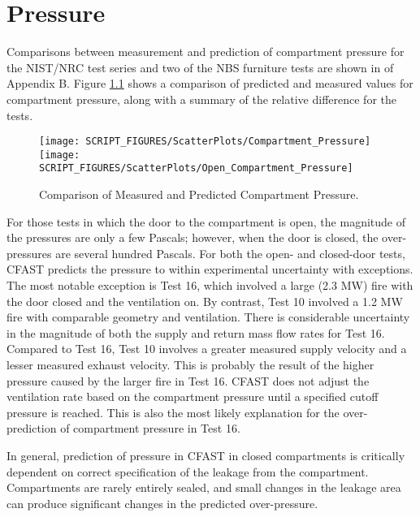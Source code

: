 \chapter{Pressure}

Comparisons between measurement and prediction of compartment pressure for the NIST/NRC test series and two of the NBS furniture tests are shown in of Appendix B.  Figure \ref{fig:Pressure_Scatter} shows a comparison of predicted and measured values for compartment pressure, along with a summary of the relative difference for the tests.
\label{Compartment Over-Pressure}
\label{Open Compartment Over-Pressure}

\begin{figure}
\begin{center}
\texttt{[image: SCRIPT\_FIGURES/ScatterPlots/Compartment\_Pressure]}  \\
\texttt{[image: SCRIPT\_FIGURES/ScatterPlots/Open\_Compartment\_Pressure]}
\end{center}
\caption{Comparison of Measured and Predicted Compartment Pressure.} \label{fig:Pressure_Scatter}
\end{figure}

For those tests in which the door to the compartment is open, the magnitude of the pressures are only a few Pascals; however, when the door is closed, the over-pressures are several hundred Pascals.  For both the open- and closed-door tests, CFAST predicts the pressure to within experimental uncertainty with exceptions.  The most notable exception is Test 16, which involved a large (2.3 MW) fire with the door closed and the ventilation on.  By contrast, Test 10 involved a 1.2 MW fire with comparable geometry and ventilation.  There is considerable uncertainty in the magnitude of both the supply and return mass flow rates for Test 16.  Compared to Test 16, Test 10 involves a greater measured supply velocity and a lesser measured exhaust velocity.  This is probably the result of the higher pressure caused by the larger fire in Test 16.  CFAST does not adjust the ventilation rate based on the compartment pressure until a specified cutoff pressure is reached.  This is also the most likely explanation for the over-prediction of compartment pressure in Test 16.

In general, prediction of pressure in CFAST in closed compartments is critically dependent on correct specification of the leakage from the compartment.  Compartments are rarely entirely sealed, and small changes in the leakage area can produce significant changes in the predicted over-pressure.

